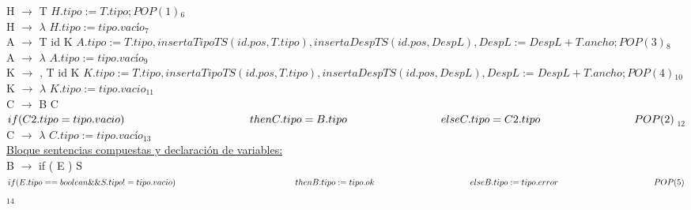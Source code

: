 \documentclass{article}[a4paper]
\newcommand\tab[1][1cm]{\hspace*{#1}}
\begin{document}
\tab H $\rightarrow$ T \textcolor{OliveGreen}{$ $\lbrace$H.tipo := T.tipo; POP(1)$\rbrace$_{6}$}\\

\tab H $\rightarrow$ $\lambda$ \textcolor{OliveGreen}{$ $\lbrace$H.tipo := tipo.vacío$\rbrace$_{7}$}\\

\tab A $\rightarrow$ T id K \textcolor{OliveGreen}{$ $\lbrace$A.tipo := T.tipo, insertaTipoTS(id.pos, T.tipo), insertaDespTS(id.pos, DespL), DespL := DespL + T.ancho; POP(3)$\rbrace$_{8}$}\\

\tab A $\rightarrow$ $\lambda$ \textcolor{OliveGreen}{$ $\lbrace$A.tipo := tipo.vacío$\rbrace$_{9}$}\\

\tab K $\rightarrow$ , T id K \textcolor{OliveGreen}{$ $\lbrace$K.tipo := T.tipo, insertaTipoTS(id.pos, T.tipo), insertaDespTS(id.pos, DespL), DespL := DespL + T.ancho; POP(4)$\rbrace$_{10}$}\\

\tab K $\rightarrow$ $\lambda$ \textcolor{OliveGreen}{$ $\lbrace$K.tipo := tipo.vacio$\rbrace$_{11}$}\\

\tab C $\rightarrow$ B C \textcolor{OliveGreen}{$ $\lbrace$if(C2.tipo = tipo.vacio) \\ \tab \tab \tab \tab
then C.tipo = B.tipo \\ \tab \tab \tab
else C.tipo = C2.tipo\\ \tab \tab \tab
POP(2)$\rbrace$_{12}$}\\

\tab C $\rightarrow$ $\lambda$ \textcolor{OliveGreen}{$ $\lbrace$C.tipo := tipo.vacío$\rbrace$_{13}$}\\


\noindent\underline{Bloque sentencias compuestas y declaración de variables:}\\

\tab B $\rightarrow$ if ( E ) S \textcolor{OliveGreen}{$ $\lbrace$if (E.tipo == boolean \&\& S.tipo != tipo.vacio) \\ \tab \tab \tab \tab \tab
then B.tipo := tipo.ok  \\ \tab \tab \tab \tab
else B.tipo := tipo.error\\ \tab \tab \tab \tab
POP(5)$\rbrace$_{14}$}\\
\end{document}
